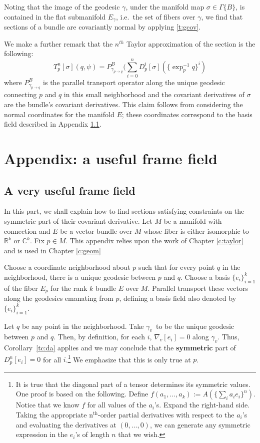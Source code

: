 \documentclass[11pt]{article}
\theoremstyle{remark}
\begin{document}
Noting that the image of the geodesic $\gamma$,  under the manifold map
$\sigma \in \ensuremath{\Gamma \{ B \}}$, is contained in the flat submanifold 
$E_{\gamma}$, i.e.\ the set of fibers over $\gamma$, we find that sections of
a bundle are covariantly normal by applying \ref{t:gcov}. 

We make a further remark that the \ensuremath{{n}^{th}} 
Taylor approximation of the section
is the following:
\[
T_p^n[\sigma] (q,\ensuremath{\psi}) = P_{\gamma_{p\to q}}^B (\sum_{i=0}^{n}
D_p^i[\sigma] (\{\ensuremath{\exp^{-1}_{p}{q}} \}^i)
\]
where $P_{\gamma_{p\to q}}^B$ is the parallel transport operator along
the unique geodesic connecting $p$ and $q$ in this small
neighborhood and the covariant derivatives of $\sigma$ are the
bundle's covariant derivatives. This claim follows from considering the
normal coordinates for the manifold $E$; these coordinates correspond
to the basis field described in Appendix \ref{a:difgeom}.

\clearpage

\section{Appendix: a useful frame field}

\subsection{A very useful frame field} \label{a:difgeom} 


In this part, we shall explain how to find sections satisfying
constraints on the symmetric part of their covariant derivative. 
Let $M$ be a manifold with connection and $E$ be a vector bundle over $M$
whose fiber is either isomorphic to \ensuremath{\mathbb{R}^{k}} or $\ensuremath{\mathbb{C}}^k$. Fix $p
\in M$. This appendix relies upon the work of Chapter \ref{c:taylor}
and is used in Chapter \ref{c:geom}


Choose a coordinate neighborhood about $p$ such that for every point
$q$ in the neighborhood, there is a unique
geodesic between $p$ and $q$. Choose a basis $\{e_i\}_{i=1}^{k}$
of the fiber $E_p$ for the rank $k$ bundle $E$  
over $M$. Parallel transport these vectors along the geodesics
emanating from $p$, defining a basis field  also denoted by 
$\{e_i\}_{i=1}^{k}$. 

Let $q$ be any point in the neighborhood. Take
\ensuremath{\gamma_v}\ to be the unique geodesic between $p$ and $q$. Then, by
definition, for each $i$, $\nabla_v [e_i] = 0$ along $\ensuremath{\gamma_v}$. Thus,
Corollary~{\ref{tc:da}} applies and we may conclude that the {\bf symmetric}
 part of  $D^n_p [e_i]
=0$ for all $i$.\footnote{It is true that the diagonal part of a
  tensor determines its symmetric values. One proof is based on the
  following. Define $f(a_1, \ldots,a_k) \ensuremath{:=} A(\{\sum_i a_i e_i \}^n)$.
Notice that we know $f$ for all values of the $a_i$'s. Expand the
right-hand side. Taking the appropriate \ensuremath{\text{n}^{\text{th}}}-order partial derivatives
with respect to the 
$a_i$'s and evaluating the derivatives at $(0,\ldots, 0)$, we can
generate any symmetric expression in the $e_i$'s of length $n$ that we
wish.} 
 We emphasize that this is only true at $p$.
\end{document}
